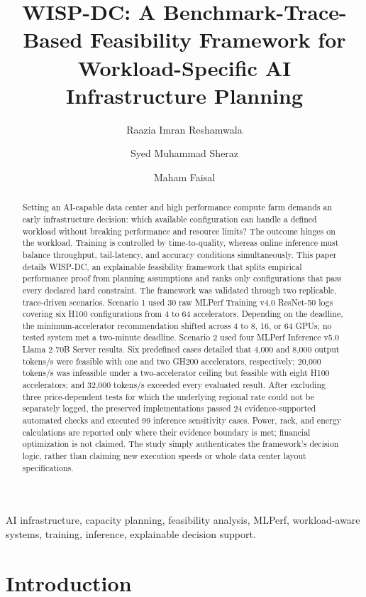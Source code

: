 \documentclass[final,3p,12pt,nopreprintline]{elsarticle}
\begin{document}
\begin{frontmatter}
\title{WISP-DC: A Benchmark-Trace-Based Feasibility Framework for Workload-Specific AI Infrastructure Planning}
\author{Raazia Imran Reshamwala}
\author{Syed Muhammad Sheraz}
\author{Maham Faisal}
\begin{abstract}Setting an AI-capable data center and high performance compute farm demands an early infrastructure decision: which available configuration can handle a defined workload without breaking performance and resource limits? The outcome hinges on the workload. Training is controlled by time-to-quality, whereas online inference must balance throughput, tail-latency, and accuracy conditions simultaneously. This paper details WISP-DC, an explainable feasibility framework that splits empirical performance proof from planning assumptions and ranks only configurations that pass every declared hard constraint. The framework was validated through two replicable, trace-driven scenarios. Scenario 1 used 30 raw MLPerf Training v4.0 ResNet-50 logs covering six H100 configurations from 4 to 64 accelerators. Depending on the deadline, the minimum-accelerator recommendation shifted across 4 to 8, 16, or 64 GPUs; no tested system met a two-minute deadline. Scenario 2 used four MLPerf Inference v5.0 Llama 2 70B Server results. Six predefined cases detailed that 4,000 and 8,000 output tokens/s were feasible with one and two GH200 accelerators, respectively; 20,000 tokens/s was infeasible under a two-accelerator ceiling but feasible with eight H100 accelerators; and 32,000 tokens/s exceeded every evaluated result. After excluding three price-dependent tests for which the underlying regional rate could not be separately logged, the preserved implementations passed 24 evidence-supported automated checks and executed 99 inference sensitivity cases. Power, rack, and energy calculations are reported only where their evidence boundary is met; financial optimization is not claimed. The study simply authenticates the framework’s decision logic, rather than claiming new execution speeds or whole data center layout specifications.\end{abstract}
\begin{keyword}AI infrastructure, capacity planning, feasibility analysis, MLPerf, workload-aware systems, training, inference, explainable decision support.\end{keyword}
\end{frontmatter}

\section{Introduction}
\end{document}
